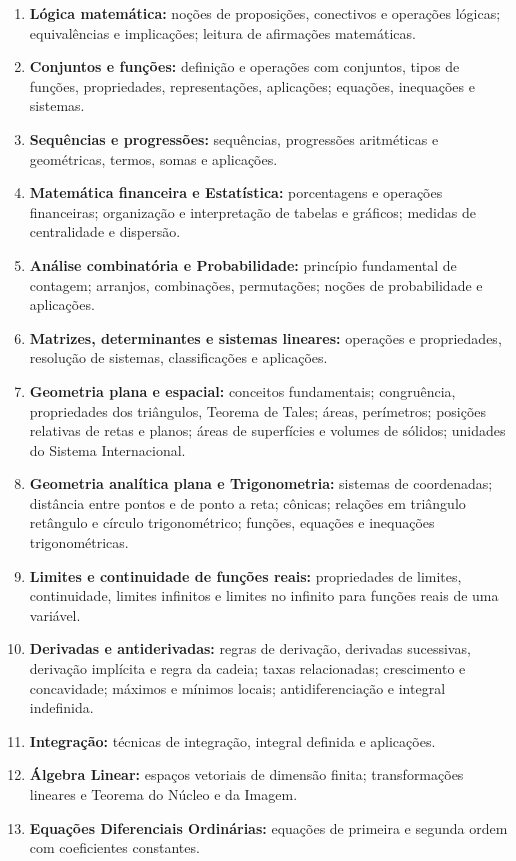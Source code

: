 \documentclass[11pt,a4paper]{article}
\begin{document}
\begin{enumerate}
\item \textbf{Lógica matemática:} noções de proposições, conectivos e operações lógicas; equivalências e implicações; leitura de afirmações matemáticas.
\item \textbf{Conjuntos e funções:} definição e operações com conjuntos, tipos de funções, propriedades, representações, aplicações; equações, inequações e sistemas.
\item \textbf{Sequências e progressões:} sequências, progressões aritméticas e geométricas, termos, somas e aplicações.
\item \textbf{Matemática financeira e Estatística:} porcentagens e operações financeiras; organização e interpretação de tabelas e gráficos; medidas de centralidade e dispersão.
\item \textbf{Análise combinatória e Probabilidade:} princípio fundamental de contagem; arranjos, combinações, permutações; noções de probabilidade e aplicações.
\item \textbf{Matrizes, determinantes e sistemas lineares:} operações e propriedades, resolução de sistemas, classificações e aplicações.
\item \textbf{Geometria plana e espacial:} conceitos fundamentais; congruência, propriedades dos triângulos, Teorema de Tales; áreas, perímetros; posições relativas de retas e planos; áreas de superfícies e volumes de sólidos; unidades do Sistema Internacional.
\item \textbf{Geometria analítica plana e Trigonometria:} sistemas de coordenadas; distância entre pontos e de ponto a reta; cônicas; relações em triângulo retângulo e círculo trigonométrico; funções, equações e inequações trigonométricas.
\item \textbf{Limites e continuidade de funções reais:} propriedades de limites, continuidade, limites infinitos e limites no infinito para funções reais de uma variável.
\item \textbf{Derivadas e antiderivadas:} regras de derivação, derivadas sucessivas, derivação implícita e regra da cadeia; taxas relacionadas; crescimento e concavidade; máximos e mínimos locais; antidiferenciação e integral indefinida.
\item \textbf{Integração:} técnicas de integração, integral definida e aplicações.
\item \textbf{Álgebra Linear:} espaços vetoriais de dimensão finita; transformações lineares e Teorema do Núcleo e da Imagem.
\item \textbf{Equações Diferenciais Ordinárias:} equações de primeira e segunda ordem com coeficientes constantes.

\end{enumerate}
\end{document}
